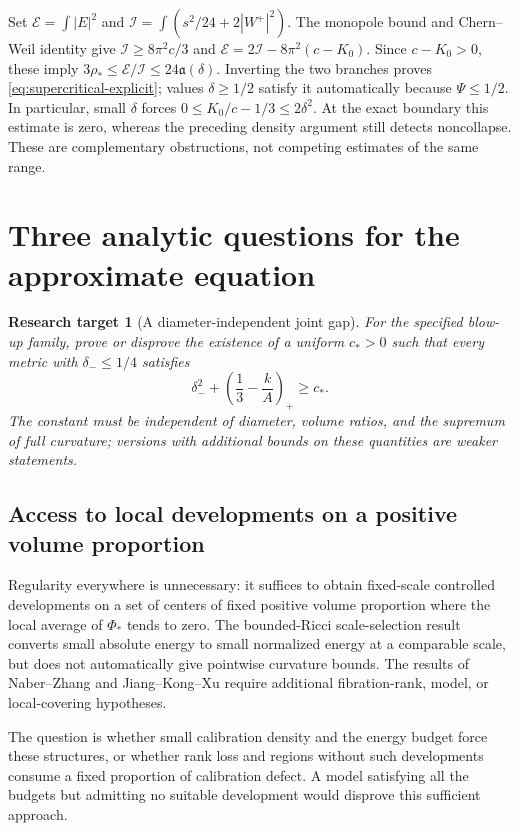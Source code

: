 \documentclass[a4paper,11pt]{article}
\numberwithin{equation}{section}
\newtheorem{target}[theorem]{Research target}
\theoremstyle{definition}
\begin{document}
Set $\mathcal E=\int|E|^2$ and
$\mathcal I=\int(s^2/24+2|W^+|^2)$.
The monopole bound and Chern--Weil identity give
$\mathcal I\ge8\pi^2c/3$ and
$\mathcal E=2\mathcal I-8\pi^2(c-K_0)$.
Since $c-K_0>0$, these imply
$3\rho_*\le\mathcal E/\mathcal I\le24\mathfrak a(\delta)$.
Inverting the two branches proves \eqref{eq:supercritical-explicit}; values $\delta\ge1/2$ satisfy it automatically because $\Psi\le1/2$. In particular, small $\delta$ forces
$0\le K_0/c-1/3\le2\delta^2$.
At the exact boundary this estimate is zero, whereas the preceding density argument still detects noncollapse. These are complementary obstructions, not competing estimates of the same range.

\section{Three analytic questions for the approximate equation}
\begin{target}[A diameter-independent joint gap]\label{tar:joint}
For the specified blow-up family, prove or disprove the existence of a uniform $c_*>0$ such that every metric with $\delta_-\le1/4$ satisfies
\begin{equation}\label{eq:joint}
\delta_-^2+\left(\frac13-\frac{k}{A}\right)_+\ge c_*.
\end{equation}
The constant must be independent of diameter, volume ratios, and the supremum of full curvature; versions with additional bounds on these quantities are weaker statements.
\end{target}

\subsection{Access to local developments on a positive volume proportion}
Regularity everywhere is unnecessary: it suffices to obtain fixed-scale controlled developments on a set of centers of fixed positive volume proportion where the local average of $\Phi_*$ tends to zero. The bounded-Ricci scale-selection result\cite[Theorem 3.4]{GJ2017} converts small absolute energy to small normalized energy at a comparable scale, but does not automatically give pointwise curvature bounds. The results of Naber--Zhang and Jiang--Kong--Xu require additional fibration-rank, model, or local-covering hypotheses\cite{NZ,JKX}.

The question is whether small calibration density and the energy budget force these structures, or whether rank loss and regions without such developments consume a fixed proportion of calibration defect. A model satisfying all the budgets but admitting no suitable development would disprove this sufficient approach.
\end{document}
